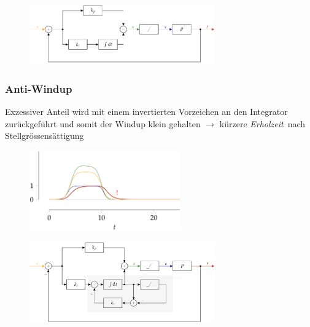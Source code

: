 \documentclass[
  10pt,
  a4paper,
  twocolumn]{article}
\numberwithin{equation}{section}
\begin{document}
\begin{figure}[H]

{\centering \includegraphics[width=8cm,height=2.6cm]{images/paste-28.png}

}

\end{figure}

\hypertarget{anti-windup}{%
\subsubsection{Anti-Windup}\label{anti-windup}}

Exzessiver Anteil wird mit einem invertierten Vorzeichen an den
Integrator zurückgeführt und somit der Windup klein gehalten
\(\rightarrow\) kürzere \emph{Erholzeit}~nach Stellgrössensättigung

\begin{figure}[H]

{\centering \includegraphics[width=6.5cm,height=\textheight]{images/paste-30.png}

}

\end{figure}

\begin{figure}[H]

{\centering \includegraphics[width=8cm,height=3.5cm]{images/paste-29.png}

}

\end{figure}
\end{document}
